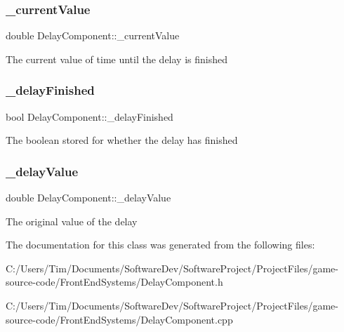 \subsubsection{\texorpdfstring{\+\_\+current\+Value}{\_currentValue}}
{\footnotesize\ttfamily double Delay\+Component\+::\+\_\+current\+Value\hspace{0.3cm}{\ttfamily [private]}}

The current value of time until the delay is finished \mbox{\label{class_delay_component_a821cd453973fced990ae204967e011ff}} 
\subsubsection{\texorpdfstring{\+\_\+delay\+Finished}{\_delayFinished}}
{\footnotesize\ttfamily bool Delay\+Component\+::\+\_\+delay\+Finished\hspace{0.3cm}{\ttfamily [private]}}

The boolean stored for whether the delay has finished \mbox{\label{class_delay_component_a36f26c01438d1c0347d06888d3b841ac}} 
\subsubsection{\texorpdfstring{\+\_\+delay\+Value}{\_delayValue}}
{\footnotesize\ttfamily double Delay\+Component\+::\+\_\+delay\+Value\hspace{0.3cm}{\ttfamily [private]}}

The original value of the delay 

The documentation for this class was generated from the following files\+:\begin{DoxyCompactItemize}
\item 
C\+:/\+Users/\+Tim/\+Documents/\+Software\+Dev/\+Software\+Project/\+Project\+Files/game-\/source-\/code/\+Front\+End\+Systems/Delay\+Component.\+h\item 
C\+:/\+Users/\+Tim/\+Documents/\+Software\+Dev/\+Software\+Project/\+Project\+Files/game-\/source-\/code/\+Front\+End\+Systems/Delay\+Component.\+cpp\end{DoxyCompactItemize}
